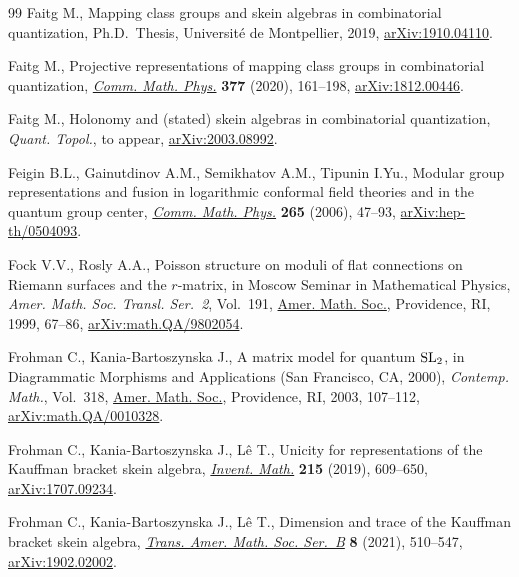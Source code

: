 \documentclass[pdftex]{sigma}%
\numberwithin{equation}{section}
\numberwithin{figure}{section}
\begin{document}
\begin{thebibliography}{99}
Faitg M., Mapping class groups and skein algebras in combinatorial
 quantization, Ph.D.~Thesis, {U}niversit\'e de Montpellier, 2019,
 \href{https://arxiv.org/abs/1910.04110}{arXiv:1910.04110}.

Faitg M., Projective representations of mapping class groups in combinatorial
 quantization, \href{https://doi.org/10.1007/s00220-019-03470-z}{\textit{Comm. Math. Phys.}} \textbf{377} (2020), 161--198,
 \href{https://arxiv.org/abs/1812.00446}{arXiv:1812.00446}.

Faitg M., Holonomy and (stated) skein algebras in combinatorial quantization,
 \textit{Quant. Topol.}, {t}o appear, \href{https://arxiv.org/abs/2003.08992}{arXiv:2003.08992}.

Feigin B.L., Gainutdinov A.M., Semikhatov A.M., Tipunin I.Yu., Modular group
 representations and fusion in logarithmic conformal field theories and in the
 quantum group center, \href{https://doi.org/10.1007/s00220-006-1551-6}{\textit{Comm. Math. Phys.}} \textbf{265} (2006), 47--93,
 \href{https://arxiv.org/abs/hep-th/0504093}{arXiv:hep-th/0504093}.

Fock V.V., Rosly A.A., Poisson structure on moduli of flat connections on
 {R}iemann surfaces and the {$r$}-matrix, in Moscow {S}eminar in
 {M}athematical {P}hysics, \textit{Amer. Math. Soc. Transl. Ser.~2}, Vol.~191,
 \href{https://doi.org/10.1090/trans2/191/03}{Amer. Math. Soc.}, Providence, RI, 1999, 67--86, \href{https://arxiv.org/abs/math.QA/9802054}{arXiv:math.QA/9802054}.

Frohman C., Kania-Bartoszynska J., A matrix model for quantum {$\rm SL_2$}, in
 Diagrammatic Morphisms and Applications ({S}an {F}rancisco, {CA}, 2000),
 \textit{Contemp. Math.}, Vol.~318, \href{https://doi.org/10.1090/conm/318/05547}{Amer. Math. Soc.}, Providence, RI, 2003,
 107--112, \href{https://arxiv.org/abs/math.QA/0010328}{arXiv:math.QA/0010328}.

Frohman C., Kania-Bartoszynska J., L\^e T., Unicity for representations of the
 {K}auffman bracket skein algebra, \href{https://doi.org/10.1007/s00222-018-0833-x}{\textit{Invent. Math.}} \textbf{215} (2019),
 609--650, \href{https://arxiv.org/abs/1707.09234}{arXiv:1707.09234}.

Frohman C., Kania-Bartoszynska J., L\^e T., Dimension and trace of the
 {K}auffman bracket skein algebra, \href{https://doi.org/10.1090/btran/69}{\textit{Trans. Amer. Math. Soc. Ser.~B}}
 \textbf{8} (2021), 510--547, \href{https://arxiv.org/abs/1902.02002}{arXiv:1902.02002}.


\end{thebibliography}
\end{document}
